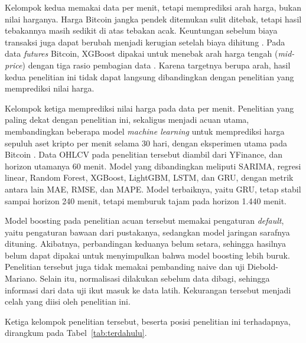 Kelompok kedua memakai data per menit, tetapi memprediksi arah harga, bukan
nilai harganya. Harga Bitcoin jangka pendek ditemukan sulit ditebak, tetapi
hasil tebakannya masih sedikit di atas tebakan acak. Keuntungan sebelum biaya
transaksi juga dapat berubah menjadi kerugian setelah biaya dihitung
\cite{jaquart2021}. Pada data \textit{futures} Bitcoin, XGBoost dipakai untuk
menebak arah harga tengah (\textit{mid-price}) dengan tiga rasio pembagian
data \cite{akyildirim2023}. Karena targetnya berupa arah, hasil kedua
penelitian ini tidak dapat langsung dibandingkan dengan penelitian yang
memprediksi nilai harga.

Kelompok ketiga memprediksi nilai harga pada data per menit. Penelitian yang
paling dekat dengan penelitian ini, sekaligus menjadi acuan utama,
membandingkan beberapa model \textit{machine learning} untuk memprediksi harga
sepuluh aset kripto per menit selama 30 hari, dengan eksperimen utama pada
Bitcoin \cite{rodrigues2025}. Data OHLCV pada penelitian tersebut diambil dari
YFinance, dan horizon utamanya 60 menit. Model yang dibandingkan meliputi
SARIMA, regresi linear, Random Forest, XGBoost, LightGBM, LSTM, dan GRU,
dengan metrik antara lain MAE, RMSE, dan MAPE. Model terbaiknya, yaitu GRU, tetap stabil
sampai horizon 240 menit, tetapi memburuk tajam pada horizon 1.440 menit.

Model boosting pada penelitian acuan tersebut memakai pengaturan
\textit{default}, yaitu pengaturan bawaan dari pustakanya, sedangkan model
jaringan sarafnya dituning. Akibatnya, perbandingan keduanya belum setara,
sehingga hasilnya belum dapat dipakai untuk menyimpulkan bahwa model boosting
lebih buruk. Penelitian tersebut juga tidak memakai pembanding naive dan uji
Diebold-Mariano. Selain itu, normalisasi dilakukan sebelum data dibagi,
sehingga informasi dari data uji ikut masuk ke data latih. Kekurangan tersebut
menjadi celah yang diisi oleh penelitian ini.

Ketiga kelompok penelitian tersebut, beserta posisi penelitian ini
terhadapnya, dirangkum pada Tabel~\ref{tab:terdahulu}.

